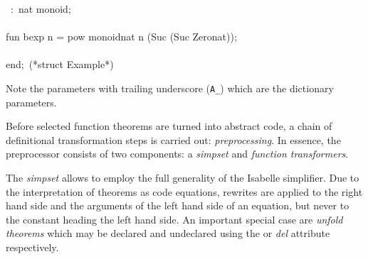\begin{isabellebody}
\begin{isamarkuptext}
\hspace*{0pt} ~:~nat monoid;\\
\hspace*{0pt}\\
\hspace*{0pt}fun bexp n = pow monoid{}nat n (Suc (Suc Zero{}nat));\\
\hspace*{0pt}\\
\hspace*{0pt}end;~(*struct Example*)%
\end{isamarkuptext}%
\isamarkuptrue%
%
\endisatagquote
{\isafoldquote}%
%
\isadelimquote
%
\endisadelimquote
%
\begin{isamarkuptext}%
\noindent Note the parameters with trailing underscore (\verb|A_|)
    which are the dictionary parameters.%
\end{isamarkuptext}%
\isamarkuptrue%
%
\isamarkuptrue%
%
\begin{isamarkuptext}%
Before selected function theorems are turned into abstract
  code, a chain of definitional transformation steps is carried
  out: \emph{preprocessing}.  In essence, the preprocessor
  consists of two components: a \emph{simpset} and \emph{function transformers}.

  The \emph{simpset} allows to employ the full generality of the
  Isabelle simplifier.  Due to the interpretation of theorems as code
  equations, rewrites are applied to the right hand side and the
  arguments of the left hand side of an equation, but never to the
  constant heading the left hand side.  An important special case are
  \emph{unfold theorems} which may be declared and undeclared using
  the \hyperlink{attribute.code-unfold}{\mbox{}} or \emph{\hyperlink{attribute.code-unfold}{\mbox{}} del}
  attribute respectively.


\end{isamarkuptext}
\end{isabellebody}

